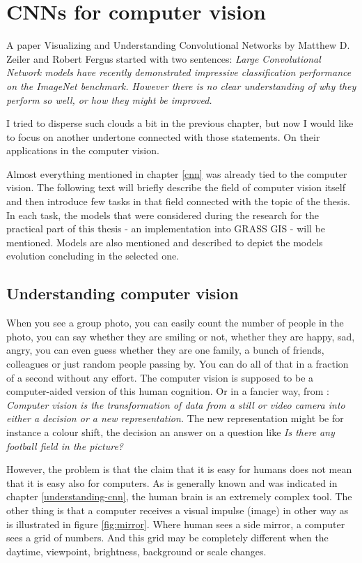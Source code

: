 \chapter{CNNs for computer vision}
\label{image-ann}

A paper Visualizing and Understanding Convolutional Networks by Matthew D. Zeiler and Robert Fergus \cite{zf-net} started with two sentences: \textit{Large Convolutional Network models have recently demonstrated impressive classification performance on the ImageNet benchmark. However there is no clear understanding of why they perform so well, or how they might be improved.}

I tried to disperse such clouds a bit in the previous chapter, but now I would like to focus on another undertone connected with those statements. On their applications in the computer vision.

Almost everything mentioned in chapter \ref{cnn} was already tied to the computer vision. The following text will briefly describe the field of computer vision itself and then introduce few tasks in that field connected with the topic of the thesis. In each task, the models that were considered during the research for the practical part of this thesis - an implementation into GRASS GIS - will be mentioned. Models are also mentioned and described to depict the models evolution concluding in the selected one.


\section{Understanding computer vision}
\label{computer-vision}

When you see a group photo, you can easily count the number of people in the photo, you can say whether they are smiling or not, whether they are happy, sad, angry, you can even guess whether they are one family, a bunch of friends, colleagues or just random people passing by. You can do all of that in a fraction of a second without any effort. The computer vision is supposed to be a computer-aided version of this human cognition. Or in a fancier way, from \cite{opencv}: \textit{Computer vision is the transformation of data from a still or video camera into either a decision or a new representation.} The new representation might be for instance a colour shift, the decision an answer on a question like \textit{Is there any football field in the picture?}

However, the problem is that the claim that it is easy for humans does not mean that it is easy also for computers. As is generally known and was indicated in chapter \ref{understanding-cnn}, the human brain is an extremely complex tool. The other thing is that a computer receives a visual impulse (image) in other way as is illustrated in figure \ref{fig:mirror}. Where human sees a side mirror, a computer sees a grid of numbers. And this grid may be completely different when the daytime, viewpoint, brightness, background or scale changes.

